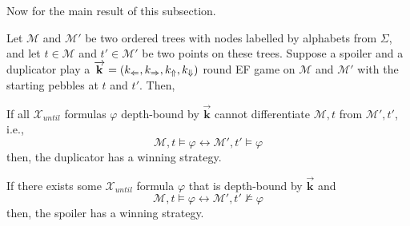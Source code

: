 \documentclass[a4paper,UKenglish,cleveref, autoref, thm-restate, numberwithinsect]{lipics-v2021}
\def\Larrow{\ensuremath\mathord{\Leftarrow}}
\def\Rarrow{\ensuremath\mathord{\Rightarrow}}
\def\Uarrow{\ensuremath\mathord{\Uparrow}}
\def\Darrow{\ensuremath\mathord{\Downarrow}}
\newcommand{\myvec}[1]{\overrightarrow{\mathbf{#1}}}
\begin{document}
Now for the main result of this subsection.
\begin{theorem}
    \label{theorem:ef-games-working-principle}
    Let $\mathcal{M}$ and $\mathcal{M}'$ be two ordered trees with nodes labelled by alphabets from $\Sigma$, and let $t \in \mathcal{M}$ and $t' \in \mathcal{M}'$ be two points on these trees. Suppose a spoiler and a duplicator play a $\myvec{k} = (k_{\Larrow}, k_{\Rarrow}, k_{\Uarrow}, k_{\Darrow})$ round EF game on $\mathcal{M}$ and $\mathcal{M}'$ with the starting pebbles at $t$ and $t'$. Then,

    \begin{bracketenumerate}
        \item If all $\mathcal{X}_{until}$ formulas $\varphi$ depth-bound by $\myvec{k}$ cannot differentiate $\mathcal{M}, t$ from $\mathcal{M}', t'$, i.e.,
            \begin{equation*}
                \mathcal{M}, t \vDash \varphi \longleftrightarrow \mathcal{M}', t' \vDash \varphi
            \end{equation*}
            then, the duplicator has a winning strategy.

        \item If there exists some $\mathcal{X}_{until}$ formula $\varphi$ that is depth-bound by $\myvec{k}$ and
            \begin{equation*}
                \mathcal{M}, t \vDash \varphi \longleftrightarrow \mathcal{M}', t' \nvDash \varphi
            \end{equation*}
            then, the spoiler has a winning strategy.
    \end{bracketenumerate}
\end{theorem}
\end{document}
